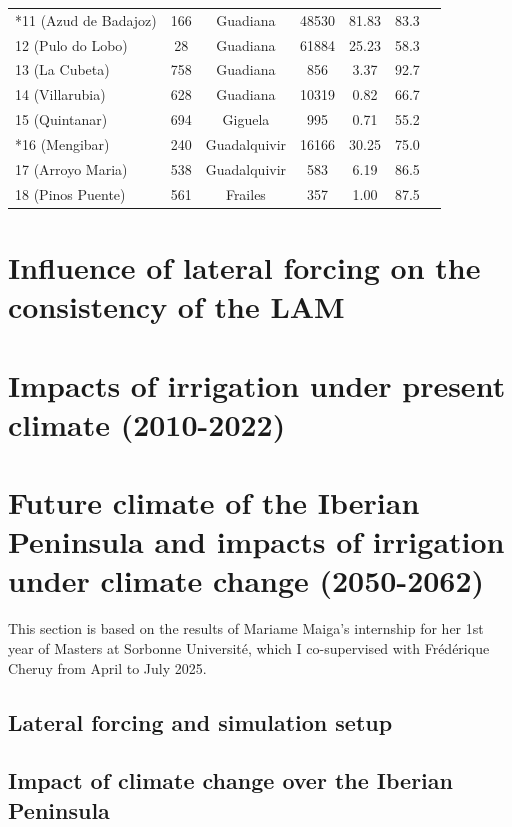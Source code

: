 \begin{table}[htbp]
{\begin{tabular}{lcccccc}
        *11 (Azud de Badajoz)   & 166   & Guadiana  & 48530     & 81.83  & 83.3 \\
        12 (Pulo do Lobo)       & 28    & Guadiana  & 61884     & 25.23  & 58.3 \\
        13 (La Cubeta)          & 758   & Guadiana  & 856       & 3.37   & 92.7 \\
        14 (Villarubia)         & 628   & Guadiana  & 10319     & 0.82   & 66.7 \\
        15 (Quintanar)          & 694   & Giguela   & 995       & 0.71   & 55.2 \\
        *16 (Mengibar)          & 240   & Guadalquivir & 16166  & 30.25  & 75.0 \\
        17 (Arroyo Maria)       & 538   & Guadalquivir & 583    & 6.19   & 86.5 \\
        18 (Pinos Puente)       & 561   & Frailes   & 357       & 1.00   & 87.5 \\
        \bottomrule
    \end{tabular}
    }
    \label{table:stations_data}
\end{table}

\clearpage

\section{Influence of lateral forcing on the consistency of the LAM}
\label{sec:forcing_influence}


\section{Impacts of irrigation under present climate (2010-2022)}
\label{sec:article1}



\section{Future climate of the Iberian Peninsula and impacts of irrigation under climate change (2050-2062)}
\label{sec:climate_change}
This section is based on the results of Mariame Maiga's internship for her 1st year of Masters at Sorbonne Université, which I co-supervised with Frédérique Cheruy from April to July 2025.
\subsection{Lateral forcing and simulation setup}
\subsection{Impact of climate change over the Iberian Peninsula}
